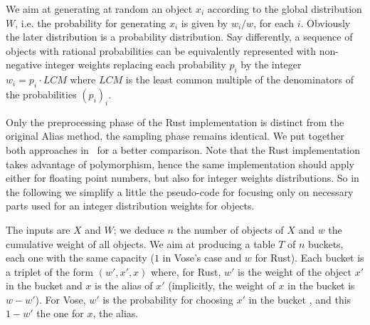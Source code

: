 We aim at generating at random an object $x_i$
according to the global distribution $W$, i.e. the probability for generating $x_i$ is given 
by $w_i / w$, for each $i$. Obviously the later distribution is a probability distribution.
Say differently, a sequence of objects with rational probabilities can be equivalently represented with non-negative integer weights
replacing each probability $p_i$ by the integer $w_i = p_i \cdot LCM$ where $LCM$ is the least common multiple of the denominators 
of the probabilities $(p_i)_i$.

Only the preprocessing phase of the Rust implementation is distinct from the original Alias method, 
the sampling phase remains identical.
We put together both approaches in~ for a better comparison.
Note that the Rust implementation takes advantage of polymorphism, hence the same implementation should apply either for floating point numbers, but also for integer weights distributions.
So in the following we simplify a little the pseudo-code for focusing only on necessary parts used for an integer distribution weights for objects.

The inputs are $X$ and $W$; we deduce $n$ the number of objects of $X$ and $w$ the cumulative weight of all objects. We aim at producing a table $T$ of $n$ buckets, each one with the same capacity ($1$ in Vose's case and $w$
for Rust).
Each bucket is a triplet of the form $(w', x', x)$  where, for Rust, $w'$ is the weight of the object $x'$ in the bucket and $x$ is the alias of $x'$ (implicitly, the weight of $x$ in the bucket is $w - w'$). 
For Vose, $w'$ is the probability for choosing $x'$ in the bucket , and this $1-w'$ the one for $x$, the alias.


